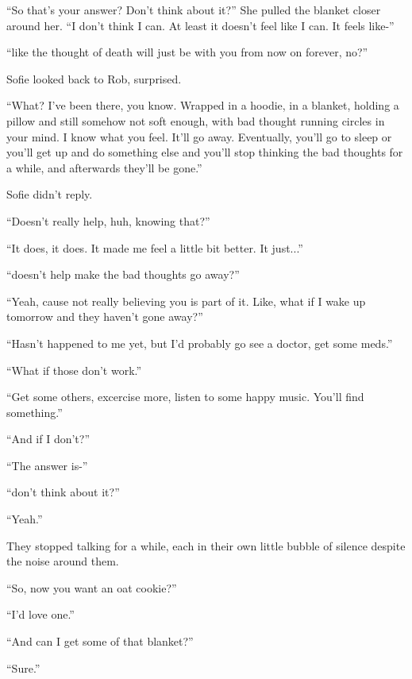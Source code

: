 \documentclass[letterpaper,12pt]{report}
\begin{document}
``So that's your answer? Don't think about it?'' She pulled the blanket closer around her. ``I don't think I can. At least it doesn't feel like I can. It feels like-''

``like the thought of death will just be with you from now on forever, no?''

Sofie looked back to Rob, surprised.

``What? I've been there, you know. Wrapped in a hoodie, in a blanket, holding a pillow and still somehow not soft enough, with bad thought running circles in your mind. I know what you feel. It'll go away. Eventually, you'll go to sleep or you'll get up and do something else and you'll stop thinking the bad thoughts for a while, and afterwards they'll be gone.''

Sofie didn't reply.

``Doesn't really help, huh, knowing that?''

``It does, it does. It made me feel a little bit better. It just...''

``doesn't help make the bad thoughts go away?''

``Yeah, cause not really believing you is part of it. Like, what if I wake up tomorrow and they haven't gone away?''

``Hasn't happened to me yet, but I'd probably go see a doctor, get some meds.''

``What if those don't work.''

``Get some others, excercise more, listen to some happy music. You'll find something.''

``And if I don't?''

``The answer is-''

``don't think about it?''

``Yeah.''

They stopped talking for a while, each in their own little bubble of silence despite the noise around them.

``So, now you want an oat cookie?''

``I'd love one.''

``And can I get some of that blanket?''

``Sure.''
\end{document}
